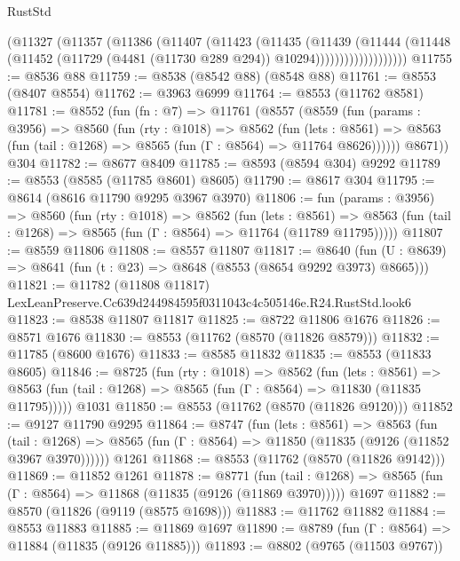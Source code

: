 \begin{lexlean}{RustStd}
\begin{coremodule}
                    (@11327
                      (@11357
                        (@11386
                          (@11407
                            (@11423
                              (@11435
                                (@11439
                                  (@11444
                                    (@11448
                                      (@11452
                                        (@11729 (@4481 (@11730 @289 @294)) @10294)))))))))))))))))))
@11755 := @8536 @88
@11759 := @8538 (@8542 @88) (@8548 @88)
@11761 := @8553 (@8407 @8554)
@11762 := @3963 @6999
@11764 := @8553 (@11762 @8581)
@11781 := @8552
    (fun (fn : @7) =>
    @11761
      (@8557
        (@8559
          (fun (params : @3956) =>
          @8560
            (fun (rty : @1018) =>
            @8562
              (fun (lets : @8561) =>
              @8563 (fun (tail : @1268) => @8565 (fun (Γ : @8564) => @11764 @8626))))))
        @8671))
    @304
@11782 := @8677 @8409
@11785 := @8593 (@8594 @304) @9292
@11789 := @8553 (@8585 (@11785 @8601) @8605)
@11790 := @8617 @304
@11795 := @8614 (@8616 @11790 @9295 @3967 @3970)
@11806 := fun (params : @3956) =>
  @8560
    (fun (rty : @1018) =>
    @8562
      (fun (lets : @8561) =>
      @8563 (fun (tail : @1268) => @8565 (fun (Γ : @8564) => @11764 (@11789 @11795)))))
@11807 := @8559 @11806
@11808 := @8557 @11807
@11817 := @8640
    (fun (U : @8639) => @8641 (fun (t : @23) => @8648 (@8553 (@8654 @9292 @3973) @8665)))
@11821 := @11782 (@11808 @11817) LexLeanPreserve.Cc639d244984595f0311043c4c505146e.R24.RustStd.look6
@11823 := @8538 @11807 @11817
@11825 := @8722 @11806 @1676
@11826 := @8571 @1676
@11830 := @8553 (@11762 (@8570 (@11826 @8579)))
@11832 := @11785 (@8600 @1676)
@11833 := @8585 @11832
@11835 := @8553 (@11833 @8605)
@11846 := @8725
    (fun (rty : @1018) =>
    @8562
      (fun (lets : @8561) =>
      @8563 (fun (tail : @1268) => @8565 (fun (Γ : @8564) => @11830 (@11835 @11795)))))
    @1031
@11850 := @8553 (@11762 (@8570 (@11826 @9120)))
@11852 := @9127 @11790 @9295
@11864 := @8747
    (fun (lets : @8561) =>
    @8563
      (fun (tail : @1268) =>
      @8565 (fun (Γ : @8564) => @11850 (@11835 (@9126 (@11852 @3967 @3970))))))
    @1261
@11868 := @8553 (@11762 (@8570 (@11826 @9142)))
@11869 := @11852 @1261
@11878 := @8771
    (fun (tail : @1268) => @8565 (fun (Γ : @8564) => @11868 (@11835 (@9126 (@11869 @3970)))))
    @1697
@11882 := @8570 (@11826 (@9119 (@8575 @1698)))
@11883 := @11762 @11882
@11884 := @8553 @11883
@11885 := @11869 @1697
@11890 := @8789 (fun (Γ : @8564) => @11884 (@11835 (@9126 @11885)))
@11893 := @8802 (@9765 (@11503 @9767))

\end{coremodule}
\end{lexlean}
